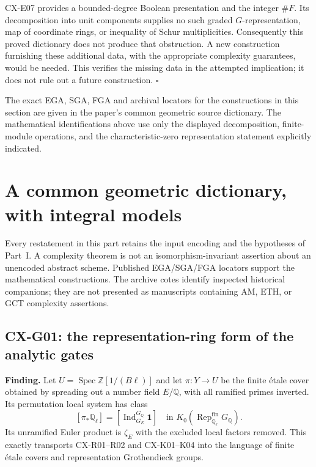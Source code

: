 \documentclass[11pt,a4paper]{article}
\begin{document}
CX-E07 provides a bounded-degree Boolean presentation and the integer
\(\#F\).
Its decomposition into unit components supplies no such graded
\(G\)-representation, map of coordinate rings, or inequality of Schur
multiplicities.
Consequently this proved dictionary does not produce that obstruction.
A new construction furnishing these additional data, with the
appropriate complexity guarantees, would be needed.
This verifies the missing data in the attempted implication; it does
not rule out a future construction.
\hfill\(\square\)

The exact EGA, SGA, FGA and archival locators for the constructions in
this section are given in the paper's common geometric source
dictionary. The mathematical identifications above use only the
displayed decomposition, finite-module operations, and the
characteristic-zero representation statement explicitly indicated.


\section{A common geometric dictionary, with integral models}
\label{sec:common-geometry}

Every restatement in this part retains the input encoding and the hypotheses
of Part~I.  A complexity theorem is not an isomorphism-invariant assertion
about an unencoded abstract scheme.  Published EGA/SGA/FGA locators support
the mathematical constructions.  The archive cotes identify inspected
historical companions; they are not presented as manuscripts containing AM,
ETH, or GCT complexity assertions.

\subsection{CX-G01: the representation-ring form of the analytic gates}
\label{finding:CX-G01}

\textbf{Finding.} Let $U=\operatorname{Spec}\mathbb Z[1/(B\ell)]$ and let
$\pi:Y\to U$ be the finite étale cover obtained by spreading out a number
field $E/\mathbb Q$, with all ramified primes inverted.  Its permutation
local system has class
\[
 [\pi_*\mathbb Q_\ell]
 = [\operatorname{Ind}_{G_E}^{G_{\mathbb Q}}\mathbf1]
 \quad\text{in }K_0(\operatorname{Rep}_{\mathbb Q_\ell}^{\mathrm{fin}}G_{\mathbb Q}).
\]
Its unramified Euler product is $\zeta_E$ with the excluded local factors
removed.  This exactly transports CX-R01--R02 and CX-K01--K04 into the
language of finite étale covers and representation Grothendieck groups.
\end{document}
